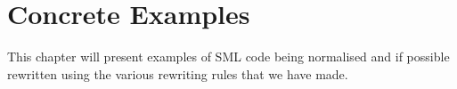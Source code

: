 \chapter{Concrete Examples}

This chapter will present examples of SML code being normalised and if possible
rewritten using the various rewriting rules that we have made.








